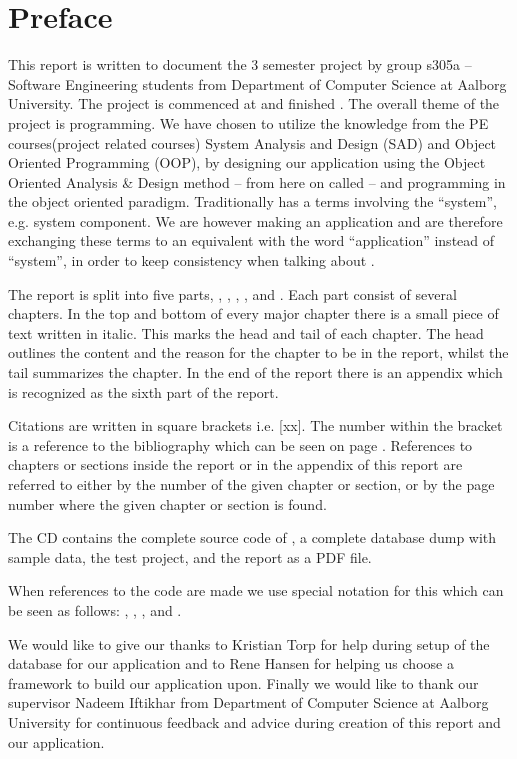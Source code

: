 \chapter*{Preface}
\label{chap:preface}
%
\emptyTop{}%
\vspace{-15mm}%
This report is written to document the 3\rd{} semester project by group s305a -- Software Engineering students from Department of Computer Science at Aalborg University. 
The project is commenced at  and finished .
The overall theme of the project is programming. 
We have chosen to utilize the knowledge from the PE courses(project related courses) System Analysis and Design (SAD) and Object Oriented Programming (OOP), by designing our application using the Object Oriented Analysis \& Design method -- from here on called \ooad[] -- and programming \hdesk[] in the object oriented paradigm.  
Traditionally \ooad[] has a terms involving the ``system'', e.g. system component.
We are however making an application and are therefore exchanging these terms to an equivalent with the word ``application'' instead of ``system'', in order to keep consistency when talking about \hdesk[].

The report is split into five parts, , , , , and .
Each part consist of several chapters.
In the top and bottom of every major chapter there is a small piece of text written in italic.
This marks the head and tail of each chapter.
The head outlines the content and the reason for the chapter to be in the report, whilst the tail summarizes the chapter.
In the end of the report there is an appendix which is recognized as the sixth part of the report.

Citations are written in square brackets i.e. [xx].
The number within the bracket is a reference to the bibliography which can be seen on page \pageref{chap:bib}.
References to chapters or sections inside the report or in the appendix of this report are referred to either by the number of the given chapter or section, or by the page number where the given chapter or section is found.

The CD contains the complete source code of \hdesk[], a complete database dump with sample data, the test project, and the report as a PDF file.  

When references to the code are made we use special notation for this which can be seen as follows: , , , and .

We would like to give our thanks to Kristian Torp for help during setup of the database for our application and to Rene Hansen for helping us choose a framework to build our application upon.
Finally we would like to thank our supervisor Nadeem Iftikhar from Department of Computer Science at Aalborg University for continuous feedback and advice during creation of this report and our application.